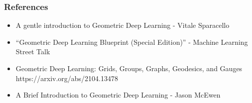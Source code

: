\begin{frame}[fragile]\frametitle{References}

\begin{itemize}
\item A gentle introduction to Geometric Deep Learning - Vitale Sparacello
\item ``Geometric Deep Learning Blueprint (Special Edition)'' - Machine Learning Street Talk
\item Geometric Deep Learning: Grids, Groups, Graphs, Geodesics, and Gauges
https://arxiv.org/abs/2104.13478
\item A Brief Introduction to Geometric Deep Learning - Jason McEwen
\end{itemize}
	  
\end{frame}
